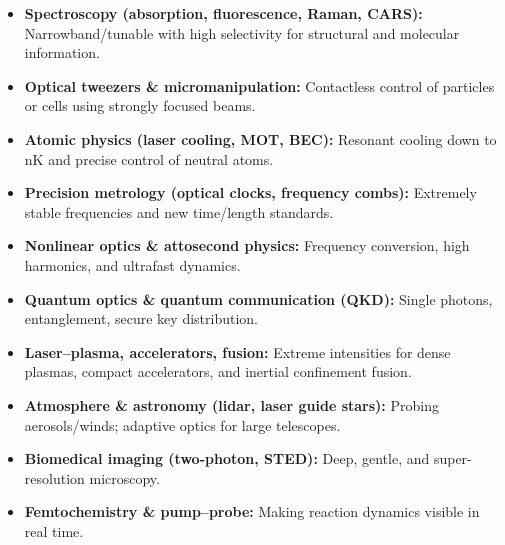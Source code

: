 \begin{tcolorbox}[didaktikbox, title={Applications of Lasers — Research (Overview)}] 
	\label{box:laser-app-forschung}
	\begin{itemize}
		\item \textbf{Spectroscopy (absorption, fluorescence, Raman, CARS):} Narrowband/tunable with high selectivity for structural and molecular information.
		\item \textbf{Optical tweezers \& micromanipulation:} Contactless control of particles or cells using strongly focused beams.
		\item \textbf{Atomic physics (laser cooling, MOT, BEC):} Resonant cooling down to nK and precise control of neutral atoms.
		\item \textbf{Precision metrology (optical clocks, frequency combs):} Extremely stable frequencies and new time/length standards.
		\item \textbf{Nonlinear optics \& attosecond physics:} Frequency conversion, high harmonics, and ultrafast dynamics.
		\item \textbf{Quantum optics \& quantum communication (QKD):} Single photons, entanglement, secure key distribution.
		\item \textbf{Laser–plasma, accelerators, fusion:} Extreme intensities for dense plasmas, compact accelerators, and inertial confinement fusion.
		\item \textbf{Atmosphere \& astronomy (lidar, laser guide stars):} Probing aerosols/winds; adaptive optics for large telescopes.
		\item \textbf{Biomedical imaging (two-photon, STED):} Deep, gentle, and super-resolution microscopy.
		\item \textbf{Femtochemistry \& pump–probe:} Making reaction dynamics visible in real time.
	\end{itemize}
\end{tcolorbox}

